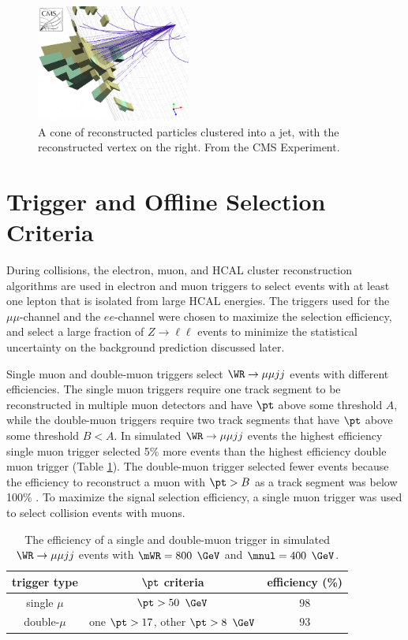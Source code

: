 \begin{figure}[h]
	\centering
	\includegraphics[width=0.45\textwidth]{figures/jetClusteringInCMS.png}
	\caption{A cone of reconstructed particles clustered into a jet, with the reconstructed vertex on the right.  
	From the CMS Experiment.}
	\label{fig:jetClustering}
\end{figure}


\section{Trigger and Offline Selection Criteria}
\label{sec:onlineAndOfflineIdSel}
During collisions, the electron, muon, and HCAL cluster reconstruction algorithms are used in electron and muon triggers to select 
events with at least one lepton that is isolated from large HCAL energies.  The triggers used for the $\mu\mu$-channel and the $ee$-channel 
were chosen to maximize the \WR selection efficiency, and select a large fraction of $Z \rightarrow \ell\ell$ events to minimize the 
statistical uncertainty on the \DY background prediction discussed later.

Single muon and double-muon triggers select $\WR \rightarrow \mu\mu jj$ events with different efficiencies.  The single muon 
triggers require one track segment to be reconstructed in multiple muon detectors and have $\pt$ above some threshold $A$, while the 
double-muon triggers require two track segments that have $\pt$ above some threshold $B < A$.  In simulated $\WR \rightarrow \mu\mu jj$ 
events the highest efficiency single muon trigger selected 5\% more \WR events than the highest efficiency double muon trigger (Table 
\ref{tab:singleVsDblMuHlt}).  The double-muon trigger selected fewer \WR events because the efficiency to reconstruct a muon with 
$\pt > B$ as a track segment was below 100\% \cite{cmsMuonRecoRunTwo}.  To maximize the signal selection efficiency, a single muon 
trigger was used to select collision events with muons.

\begin{table}[h]
	\caption{The efficiency of a single and double-muon trigger in simulated $\WR \rightarrow \mu\mu jj$ events with $\mWR = 800$ $\GeV$ 
		and $\mnul = 400$ $\GeV$.}
	\label{tab:singleVsDblMuHlt}
	\centering
	\begin{tabular}{c|c|c}
		trigger type & $\pt$ criteria & efficiency (\%) \\  \hline
		single $\mu$ & $\pt >50$ $\GeV$ & 98  \\ 
		double-$\mu$ & one $\pt >17$, other $\pt >8$ $\GeV$ & 93  \\
	\end{tabular}
\end{table}

